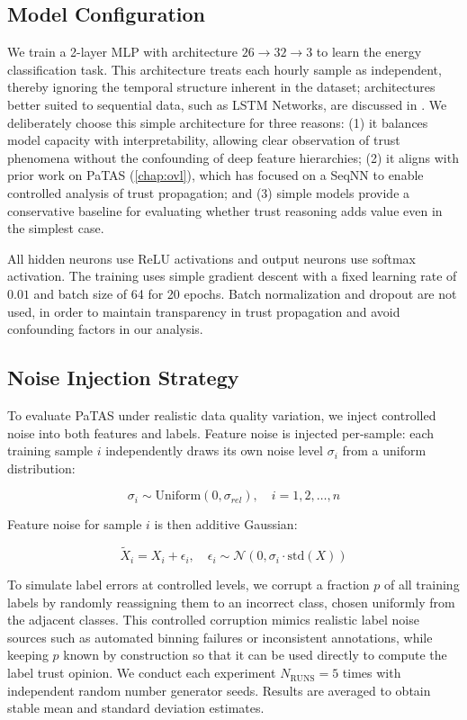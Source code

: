 \subsection{Model Configuration}
\label{sec:model_config}

We train a 2-layer \ac{MLP} with architecture $26 \to 32 \to 3$ to learn the energy classification task. This architecture treats each hourly sample as independent, thereby ignoring the temporal structure inherent in the dataset; architectures better suited to sequential data, such as \ac{LSTM} Networks, are discussed in . We deliberately choose this simple architecture for three reasons: (1) it balances model capacity with interpretability, allowing clear observation of trust phenomena without the confounding of deep feature hierarchies; (2) it aligns with prior work on \ac{PaTAS} (\cref{chap:ovl}), which has focused on a \acf{SeqNN} to enable controlled analysis of trust propagation; and (3) simple models provide a conservative baseline for evaluating whether trust reasoning adds value even in the simplest case.

All hidden neurons use ReLU activations and output neurons use softmax activation. The training uses simple gradient descent with a fixed learning rate of $0.01$ and batch size of 64 for 20 epochs. Batch normalization and dropout are not used, in order to maintain transparency in trust propagation and avoid confounding factors in our analysis.

\subsection{Noise Injection Strategy}
\label{sec:noise_injection}

To evaluate \ac{PaTAS} under realistic data quality variation, we inject controlled noise into both features and labels. Feature noise is injected per-sample: each training sample $i$ independently draws its own noise level $\sigma_i$ from a uniform distribution:

\[
\sigma_i \sim \text{Uniform}(0, \sigma_{rel}), \quad i = 1, 2, \ldots, n
\]

Feature noise for sample $i$ is then additive Gaussian:

\[
\tilde{X}_i = X_i + \epsilon_i, \quad \epsilon_i \sim \mathcal{N}(0, \sigma_i \cdot \text{std}(X))
\]

To simulate label errors at controlled levels, we corrupt a fraction $p$ of all training labels by randomly reassigning them to an incorrect class, chosen uniformly from the adjacent classes. This controlled corruption mimics realistic label noise sources such as automated binning failures or inconsistent annotations, while keeping $p$ known by construction so that it can be used directly to compute the label trust opinion. We conduct each experiment $N_{\text{RUNS}} = 5$ times with independent random number generator seeds. Results are averaged to obtain stable mean and standard deviation estimates.


